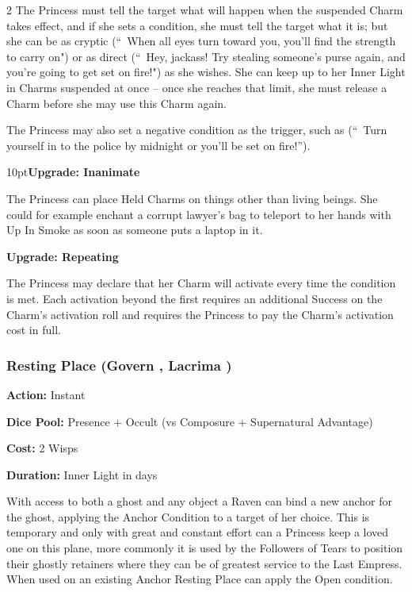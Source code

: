 \begin{multicols}{2}
The Princess must tell the target what will happen when the suspended Charm takes effect, and if she sets a condition, she must tell the target what it is; but she can be as cryptic (\textquotedblleft\, When all eyes turn toward you, you'll find the strength to carry on") or as direct (\textquotedblleft\, Hey, jackass! Try stealing someone's purse again, and you're going to get set on fire!") as she wishes. She can keep up to her Inner Light in Charms suspended at once -- once she reaches that limit, she must release a Charm before she may use this Charm again.

The Princess may also set a negative condition as the trigger, such as (\textquotedblleft\, Turn yourself in to the police by midnight or you'll be set on fire!\textquotedblright). 

\begin{myindentpar}{10pt}\textbf{Upgrade: Inanimate}

The Princess can place Held Charms on things other than living beings. She could for example enchant a corrupt lawyer's bag to teleport to her hands with Up In Smoke as soon as someone puts a laptop in it.

\textbf{Upgrade: Repeating}

The Princess may declare that her Charm will activate every time the condition is met. Each activation beyond the first requires an additional Success on the Charm's activation roll and requires the Princess to pay the Charm's activation cost in full.\end{myindentpar}

\subsubsection*{Resting Place (Govern \textbullet\textbullet\textbullet, Lacrima \textbullet\textbullet\textbullet)}

\noindent \textbf{Action:} Instant

\noindent \textbf{Dice Pool:} Presence + Occult (vs Composure + Supernatural Advantage)

\noindent \textbf{Cost:} 2 Wisps

\noindent \textbf{Duration:} Inner Light in days

With access to both a ghost and any object a Raven can bind a new anchor for the ghost, applying the Anchor Condition to a target of her choice. This is temporary and only with great and constant effort can a Princess keep a loved one on this plane, more commonly it is used by the Followers of Tears to position their ghostly retainers where they can be of greatest service to the Last Empress. When used on an existing Anchor Resting Place can apply the Open condition. 


\end{multicols}
